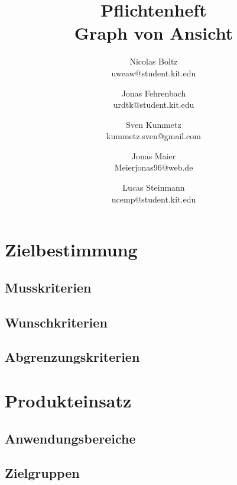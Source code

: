 \documentclass[a4paper]{scrreprt}
\begin{document}
\title{Pflichtenheft\\
Graph von Ansicht}
\date{}
\author{Nicolas Boltz   \\ uweaw@student.kit.edu
  \and Jonas Fehrenbach \\ urdtk@student.kit.edu
  \and Sven Kummetz     \\ kummetz.sven@gmail.com
  \and Jonas Maier      \\ Meierjonas96@web.de
  \and Lucas Steinmann  \\ ucemp@student.kit.edu
}
\maketitle


\tableofcontents

\chapter{Zielbestimmung}
\section{Musskriterien}

\section{Wunschkriterien}

\section{Abgrenzungskriterien}

\chapter{Produkteinsatz}

\section{Anwendungsbereiche}

\section{Zielgruppen}
\end{document}
